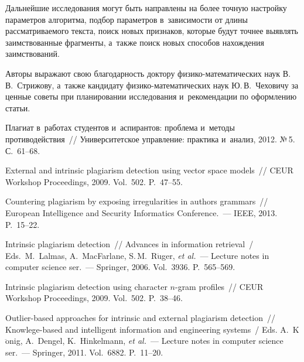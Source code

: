 \begin{multicols}{2}
Дальнейшие исследования могут быть на\-прав\-ле\-ны на более точную настройку 
параметров алгоритма, подбор параметров в~зависимости от длины рассматриваемого 
текста, поиск новых признаков, которые будут точнее выявлять заимствованные\linebreak 
фрагменты, а~также поиск новых способов на\-хож\-де\-ния заимствований.

\bigskip

Авторы выражают свою благодарность доктору фи\-зи\-ко-ма\-те\-ма\-ти\-че\-ских 
наук В.\,В.~Стрижову, а~также 
кандидату фи\-зи\-ко-ма\-те\-ма\-ти\-че\-ских наук Ю.\,В.~Чеховичу 
за ценные советы при планировании исследования и~рекомендации по оформлению статьи.



{\small\frenchspacing
 {%
 \begin{thebibliography}{99}
   Плагиат в~работах 
студентов и~аспирантов: проблема и~методы противодействия~// Университетское 
управление: практика и~анализ, 2012. №\,5. С.~61--68.

 External and intrinsic 
plagiarism detection using vector space models~// CEUR Workshop Proceedings, 2009. 
Vol.~502. P.~47--55.

   Countering plagiarism by exposing 
irregularities in authors grammars~// European Intelligence and Security 
Informatics Conference.~--- IEEE, 2013. P.~15--22.



 Intrinsic plagiarism detection~// 
Advances in information retrieval~/ Eds.\ M.~Lalmas, A.~MacFarlane, 
S.\,M.~R$\ddot{\mbox{u}}$ger,
\textit{et al.}~--- Lecture 
notes in computer science ser.~--- Springer, 2006. Vol.~3936. 
P.~565--569.

 Intrinsic plagiarism detection using character 
$n$-gram profiles~// CEUR Workshop Proceedings, 2009. Vol.~502. P.~38--46.

Outlier-based approaches for intrinsic and external plagiarism detection~// 
Knowlege-based and intelligent 
information and engineering systems~/
Eds. A.~K$\ddot{\mbox{o}}$nig, A.~Dengel, K.~Hinkelmann, \textit{et al.}~--- Lecture 
notes in computer science ser.~--- Springer, 
2011. Vol.~6882.  P.~11--20.


\end{thebibliography}}}
\end{multicols}
